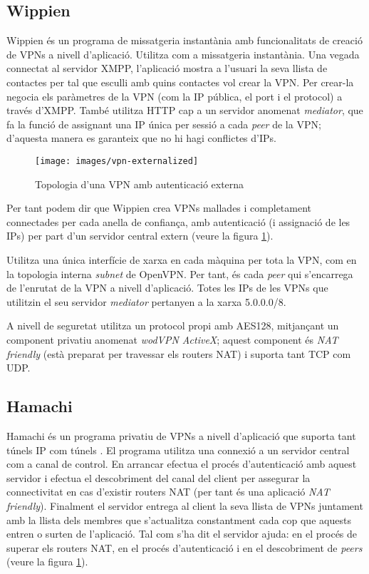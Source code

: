 \subsection{Wippien}
Wippien és un programa de missatgeria instantània amb funcionalitats de creació de VPNs a nivell d'aplicació. Utilitza  com a missatgeria instantània. Una vegada connectat al servidor XMPP, l'aplicació mostra a l'usuari la seva llista de contactes per tal que esculli amb quins contactes vol crear la VPN. Per crear-la negocia els paràmetres de la VPN (com la IP pública, el port i el protocol) a través d'XMPP. També utilitza HTTP cap a un servidor anomenat \emph{mediator}, que fa la funció de  assignant una IP única per sessió a cada \emph{peer} de la VPN; d'aquesta manera es garanteix que no hi hagi conflictes d'IPs.
\begin{figure}[htb]
\centering
\texttt{[image: images/vpn-externalized]}
\caption{Topologia d'una VPN amb autenticació externa}
\label{F:vpn-externalized}
\end{figure}
Per tant podem dir que Wippien crea VPNs mallades i completament connectades per cada anella de confiança, amb autenticació (i assignació de les IPs) per part d'un servidor central extern (veure la figura \ref{F:vpn-externalized}).

Utilitza una única interfície de xarxa en cada màquina per tota la VPN, com en la topologia interna \emph{subnet} de OpenVPN. Per tant, és cada \emph{peer} qui s'encarrega de l'enrutat de la VPN a nivell d'aplicació. Totes les IPs de les VPNs que utilitzin el seu servidor \emph{mediator} pertanyen a la xarxa 5.0.0.0/8.

A nivell de seguretat utilitza un protocol propi amb AES128, mitjançant un component privatiu anomenat \emph{wodVPN ActiveX}; aquest component és \emph{NAT friendly} (està preparat per travessar els routers NAT) i suporta tant TCP com UDP.

\subsection{Hamachi}
Hamachi és un programa privatiu de VPNs a nivell d'aplicació que suporta tant túnels IP com túnels .
El programa utilitza una connexió a un servidor central com a canal de control. En arrancar efectua el procés d'autenticació amb aquest servidor i efectua el descobriment del canal del client per assegurar la connectivitat en cas d'existir routers NAT (per tant és una aplicació \emph{NAT friendly}). Finalment el servidor entrega al client la seva llista de VPNs juntament amb la llista dels membres que s'actualitza constantment cada cop que aquests entren o surten de l'aplicació. Tal com s'ha dit el servidor ajuda: en el procés de superar els routers NAT, en el procés d'autenticació i en el descobriment de \emph{peers} (veure la figura \ref{F:vpn-externalized}).


